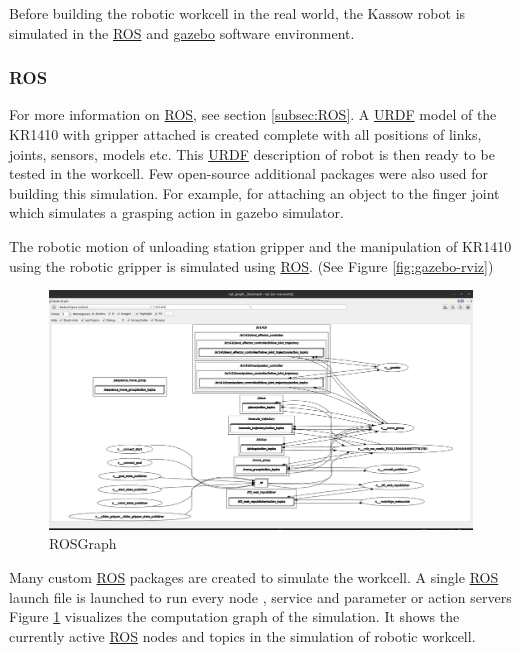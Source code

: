 Before building the robotic workcell in the real world, the Kassow robot is simulated in the \hyperref[acro:ROS]{ROS} and \hyperref[acro:Gazebo]{gazebo} software environment.

\subsubsection{ROS}
\label{subsubsec:ROS}
For more information on \hyperref[acro:ROS]{ROS}, see section \ref{subsec:ROS}. A \hyperref[acro:URDF]{URDF} model of the KR1410 with gripper attached is created
complete with all positions of links, joints, sensors, models etc. This \hyperref[acro:URDF]{URDF} description of robot is then ready to be tested
in the workcell. Few open-source additional packages were also used for building this simulation. For example, for attaching an
object to the finger joint which simulates a grasping action in gazebo simulator. \cite{gazebo-pkgs}

The robotic motion of unloading station gripper and the manipulation of KR1410 using the robotic gripper is simulated using \hyperref[acro:ROS]{ROS}. (See Figure \ref{fig:gazebo-rviz})

\begin{figure}[h]
    \centering
    \includegraphics[width=\textwidth]{figures/rosgraph.png}
    \caption{ROSGraph}
    \label{fig:rosgraph}
\end{figure}

Many custom \hyperref[acro:ROS]{ROS} packages \cite{rospackage} are created to simulate the workcell. A single \hyperref[acro:ROS]{ROS} launch \cite{roslaunch} file is launched to run every node \cite{rosnode}, service \cite{rosservice} and parameter \cite{parameterserver} or action servers \cite{actionserver}
Figure \ref{fig:rosgraph} visualizes the computation graph of the simulation. It shows the currently active \hyperref[acro:ROS]{ROS} nodes \cite{rosnode}
and topics \cite{rostopic} in the simulation of robotic workcell.


